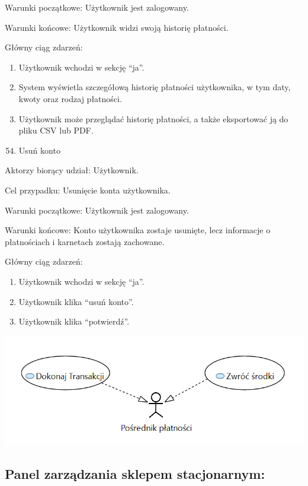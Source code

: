 \documentclass[
]{article}
\providecommand{\tightlist}{%
  \setlength{\itemsep}{0pt}\setlength{\parskip}{0pt}}
\begin{document}
{Warunki początkowe: Użytkownik jest zalogowany.}

{Warunki końcowe: Użytkownik widzi swoją historię płatności.}

{Główny ciąg zdarzeń:}

\begin{enumerate}
\tightlist
\item
  {Użytkownik wchodzi w sekcję ``ja''.}
\item
  {System wyświetla szczegółową historię płatności użytkownika, w tym
  daty, kwoty oraz rodzaj płatności.}
\item
  {Użytkownik może przeglądać historię płatności, a także eksportować ją
  do pliku CSV lub PDF.}
\end{enumerate}

{}

\begin{enumerate}
\setcounter{enumi}{53}
\tightlist
\item
  {Usuń konto}
\end{enumerate}

{Aktorzy biorący udział: Użytkownik.}

{Cel przypadku: Usunięcie konta użytkownika.}

{Warunki początkowe: Użytkownik jest zalogowany.}

{Warunki końcowe: Konto użytkownika zostaje usunięte, lecz informacje o
płatnościach i karnetach zostają zachowane.}

{Główny ciąg zdarzeń:}

\begin{enumerate}
\tightlist
\item
  {Użytkownik wchodzi w sekcję ``ja''.}
\item
  {Użytkownik klika ``usuń konto''.}
\item
  {Użytkownik klika ``potwierdź''.}
\end{enumerate}

{\includegraphics{diagrams/use_cases/posrednik_platnosci.png}}

\hypertarget{h.q7tyc5bsqba0}{%
\subsection{\texorpdfstring{{Panel zarządzania sklepem
stacjonarnym:}}{Panel zarządzania sklepem stacjonarnym:}}\label{h.q7tyc5bsqba0}}
\end{document}
